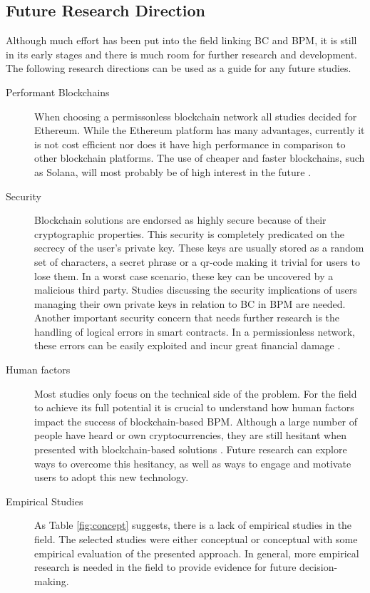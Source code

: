 \subsection{Future Research Direction}
Although much effort has been put into the field linking BC and BPM, it is still in its early stages and there is much room for further research and development. The following research directions can be used as a guide for any future studies. 
\begin{description}
  \item[Performant Blockchains] When choosing a permissonless blockchain network all studies decided for Ethereum. While the Ethereum platform has many advantages, currently it is not cost efficient nor does it have high performance in comparison to other blockchain platforms. The use of cheaper and faster blockchains, such as Solana, will most probably be of high interest in the future \cite{pierro2022can}.   
  \item[Security] Blockchain solutions are endorsed as highly secure because of their cryptographic properties. This security is completely predicated on the secrecy of the user's private key. These keys are usually stored as a random set of characters, a secret phrase or a qr-code making it trivial for users to lose them. In a worst case scenario, these key can be uncovered by a malicious third party. Studies discussing the security implications of users managing their own private keys in relation to BC in BPM are needed. Another important security concern that needs further research is the handling of logical errors in smart contracts. In a permissionless network, these errors can be easily exploited and incur great financial damage \cite{atzei2017survey}.    
  \item[Human factors] Most studies only focus on the technical side of the problem. For the field to achieve its full potential it is crucial to understand how human factors impact the success of blockchain-based BPM. Although a large number of people have heard or own cryptocurrencies, they are still hesitant when presented with blockchain-based solutions \cite{alshamsi2022systematic}. Future research can explore ways to overcome this hesitancy, as well as ways to engage and motivate users to adopt this new technology.

  \item[Empirical Studies] As Table \ref{fig:concept} suggests, there is a lack of empirical studies in the field. The selected studies were either conceptual or conceptual with some empirical evaluation of the presented approach. In general, more empirical research is needed in the field to provide evidence for future decision-making.
\end{description}